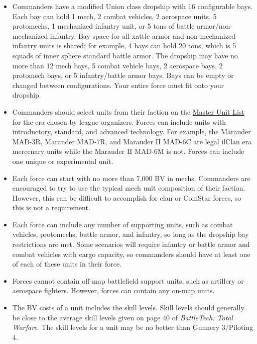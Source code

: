 \documentclass{article}
\begin{document}
\begin{itemize}

\item Commanders have a modified Union class dropship with 16 configurable bays.
Each bay can hold 1 mech, 2 combat vehicles, 2 aerospace units, 5 protomechs, 1 mechanized infantry unit, or 5 tons of battle armor/non-mechanized infantry.
Bay space for all xattle armor and non-mechanized infantry units is shared; for example, 4 bays can hold 20 tons, which is 5 squads of inner sphere standard battle armor.
The dropship may have no more than 12 mech bays, 5 combat vehicle bays, 2 aerospace bays, 2 protomech bays, or 5 infantry/battle armor bays.
Bays can be empty or changed between configurations.
Your entire force must fit onto your dropship.

\item Commanders should select units from their faction on the \href{http://www.masterunitlist.info/}{Master Unit List} for the era chosen by league organizers.
Forces can include units with introductory, standard, and advanced technology.
For example, the Marauder MAD-3R, Marauder MAD-7R, and Marauder II MAD-6C are legal ilClan era mercenary units while the Marauder II MAD-6M is not.
Forces can include one unique or experimental unit.

\item Each force can start with no more than 7,000 BV in mechs.
Commanders are encouraged to try to use the typical mech unit composition of their faction.
However, this can be difficult to accomplish for clan or ComStar forces, so this is not a requirement.

\item Each force can include any number of supporting units, such as combat vehicles, protomechs, battle armor, and infantry, so long as the dropship bay restrictions are met.
Some scenarios will require infantry or battle armor and combat vehicles with cargo capacity, so commanders should have at least one of each of these units in their force.

\item Forces cannot contain off-map battlefield support units, such as artillery or aerospace fighters.
However, forces can contain any on-map units.

\item The BV costs of a unit includes the skill levels.
Skill levels should generally be close to the average skill levels given on page 40 of \emph{BattleTech: Total Warfare}.
The skill levels for a unit may be no better than Gunnery 3/Piloting 4.

\end{itemize}
\end{document}
